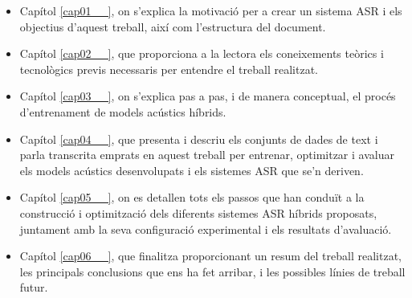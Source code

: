 \begin{itemize}
    \item Capítol \ref{cap01__}, on s'explica la motivació per a crear un sistema ASR i els objectius d'aquest treball, així com l'estructura del document.
    \item Capítol \ref{cap02__}, que proporciona a la lectora els coneixements teòrics i tecnològics previs necessaris per entendre el treball realitzat.
    \item Capítol \ref{cap03__}, on s'explica pas a pas, i de manera conceptual, el procés d'entrenament de models acústics híbrids.
    \item Capítol \ref{cap04__}, que presenta i descriu els conjunts de dades de text i parla transcrita emprats en aquest treball per entrenar, optimitzar i avaluar els models acústics desenvolupats i els sistemes ASR que se'n deriven.
    \item Capítol \ref{cap05__}, on es detallen tots els passos que han conduït a la construcció i optimització dels diferents sistemes ASR híbrids proposats, juntament amb la seva configuració experimental i els resultats d'avaluació.
    \item Capítol \ref{cap06__}, que finalitza proporcionant un resum del treball realitzat, les principals conclusions que ens ha fet arribar, i les possibles línies de treball futur.
\end{itemize}
